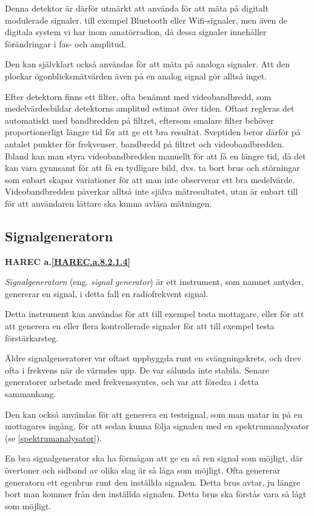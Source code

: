 Denna detektor är därför utmärkt att använda för att mäta på digitalt
modulerade signaler. till exempel Bluetooth eller Wifi-signaler, men även de digitala
system vi har inom amatörradion, då dessa signaler innehåller förändringar i
fas- och amplitud.

Den kan självklart också användas för att mäta på analoga signaler.
Att den plockar ögonblicksmätvärden även på en analog signal gör alltså inget.

Efter detektorn finns ett filter, ofta benämnt med videobandbredd, som
medelvärdesbildar detektorns amplitud estimat över tiden.
Oftast regleras det automatiskt med bandbredden på filtret, eftersom smalare
filter behöver proportionerligt längre tid för att ge ett bra resultat.
Sveptiden beror därför på antalet punkter för frekvenser, bandbredd på filtret
och videobandbredden.
Ibland kan man styra videobandbredden manuellt för att få en längre tid, då
det kan vara gynnsamt för att få en tydligare bild, dvs. ta bort brus och
störningar som enbart skapar variationer för att man inte observerar ett bra
medelvärde.
Videobandbredden påverkar alltså inte själva mätresultatet, utan är enbart till
för att användaren lättare ska kunna avläsa mätningen.

\subsection{Signalgeneratorn}
\textbf{
HAREC a.\ref{HAREC.a.8.2.1.4}\label{myHAREC.a.8.2.1.4}
}

\emph{Signalgeneratorn} (eng. \emph{signal generator}) är ett instrument, som
namnet antyder, genererar en signal, i detta fall en radiofrekvent signal.

Detta instrument kan användas för att till exempel testa mottagare, eller för att att
generera en eller flera kontrollerade signaler för att till exempel testa
förstärkarsteg.

Äldre signalgeneratorer var oftast uppbyggda runt en svängningskrets, och drev
ofta i frekvens när de värmdes upp.
De var sålunda inte stabila.
Senare generatorer arbetade med frekvenssyntes, och var att föredra i detta
sammanhang.

Den kan också användas för att generera en testsignal, som man matar in på en
mottagares ingång, för att sedan kunna följa signalen med en spektrumanalysator
(se \ref{spektrumanalysator}).

En bra signalgenerator ska ha förmågan att ge en så ren signal som möjligt,
där övertoner och sidband av olika slag är så låga som möjligt.
Ofta genererar generatorn ett egenbrus runt den inställda signalen.
Detta brus avtar, ju längre bort man kommer från den inställda signalen.
Detta brus ska förstås vara så lågt som möjligt.


